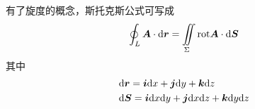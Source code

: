 有了旋度的概念，斯托克斯公式可写成
\begin{equation*}
    \oint_{L}\bm{A}\cdot\mathrm{d} \bm{r}=\iint \limits_{\Sigma}\text{rot}\bm{A}\cdot\mathrm{d} \bm{S}
\end{equation*}
其中
\begin{align*}
    & \mathrm{d} \bm{r}=\bm{i}\mathrm{d} x+\bm{j}\mathrm{d} y+\bm{k}\mathrm{d} z \\
    & \mathrm{d} \bm{S}=\bm{i}\mathrm{d} x\mathrm{d} y+\bm{j}\mathrm{d} x\mathrm{d} z+\bm{k}\mathrm{d} y\mathrm{d} z
\end{align*}